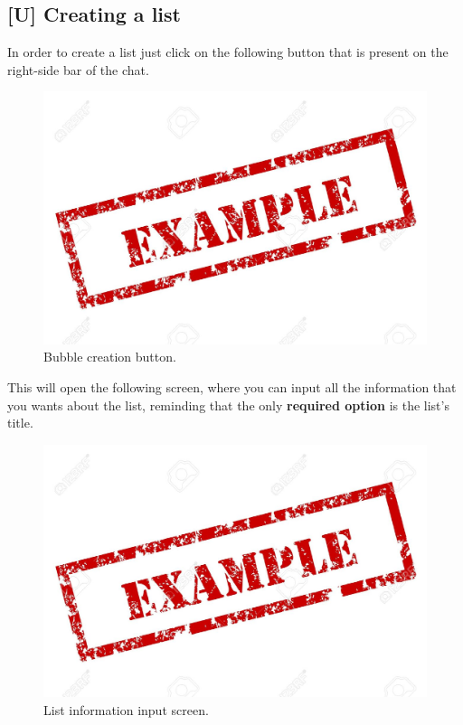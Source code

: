 \subsection{[U] Creating a list}
In order to create a list just click on the following button that is present on the right-side bar of the chat.

\begin{figure}[H]
  \centering 
  \includegraphics[width=\textwidth]{Sections/3-HowToUse/Images/example.jpeg}
  \caption{Bubble creation button.}
\end{figure}

This will open the following screen, where you can input all the information that you wants about the list, reminding that the only \textbf{required option} is the list's title.

\begin{figure}[H]
  \centering 
  \includegraphics[width=\textwidth]{Sections/3-HowToUse/Images/example.jpeg}
  \caption{List information input screen.}
\end{figure}


